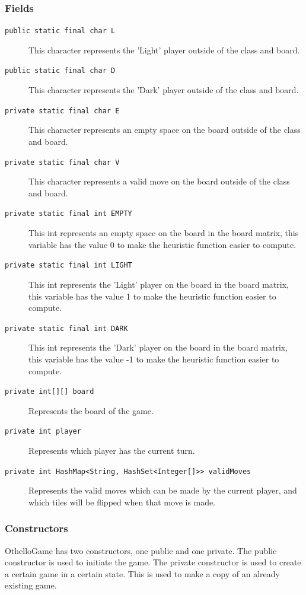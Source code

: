 \documentclass[a4paper]{article}
\begin{document}
\subsubsection{Fields}
\begin{description}
\item[\texttt{public static final char L}] This character represents the 'Light' player outside of the class and board.
\item[\texttt{public static final char D}] This character represents the 'Dark' player outside of the class and board.
\item[\texttt{private static final char E}] This character represents an empty space on the board outside of the class and board.
\item[\texttt{private static final char V}] This character represents a valid move on the board outside of the class and board.
\item[\texttt{private static final int EMPTY}] This int represents an empty space on the board in the board matrix, this variable has the value 0 to make the heuristic function easier to compute. 
\item[\texttt{private static final int LIGHT}] This int represents the 'Light' player on the board in the board matrix, this variable has the value 1 to make the heuristic function easier to compute. 
\item[\texttt{private static final int DARK}] This int represents the 'Dark' player on the board in the board matrix, this variable has the value -1 to make the heuristic function easier to compute. 
\item[\texttt{private int[][] board}] Represents the board of the game.
\item[\texttt{private int player}] Represents which player has the current turn.
\item[\texttt{private int HashMap<String, HashSet<Integer[]>> validMoves}] Represents the valid moves which can be made by the current player, and which tiles will be flipped when that move is made.
\end{description} 
\subsubsection{Constructors}
OthelloGame has two constructors, one public and one private. The public constructor is used to initiate the game. The private constructor is used to create a certain game in a certain state. This is used to make a copy of an already existing game.
\end{document}
